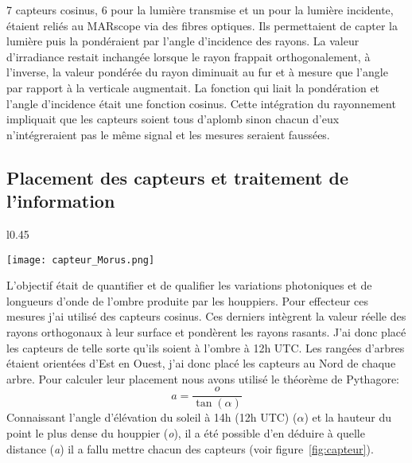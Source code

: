 \documentclass[12pt]{report}
\begin{document}
7 capteurs cosinus, 6 pour la lumière transmise et un pour la lumière incidente,
étaient reliés au MARscope via des fibres optiques. Ils permettaient de capter la
lumière puis la pondéraient par l'angle d'incidence
des rayons. La valeur d'irradiance restait inchangée
lorsque le rayon frappait orthogonalement, à l'inverse, la valeur pondérée du rayon
diminuait au fur et à mesure que l'angle par rapport à la verticale augmentait. La
fonction qui liait la pondération et l'angle d'incidence était une fonction
cosinus. Cette intégration du rayonnement
impliquait que les capteurs soient tous d'aplomb sinon chacun d'eux
n'intégreraient pas le même signal et les mesures seraient faussées.

\subsection{Placement des capteurs et traitement de l'information}

\begin{wrapfigure}{l}{0.45\textwidth}
  \vspace{-20pt}
  \begin{center}
    \texttt{[image: capteur\_Morus.png]}
  \end{center}
  \caption{Photographie d'un capteur sous un \textit{M. alba}\label{fig:capteur}}
\end{wrapfigure}

L'objectif était de quantifier et de qualifier les variations photoniques et de
longueurs d'onde de l'ombre produite par les houppiers. Pour effecteur ces
mesures j'ai utilisé des capteurs cosinus. Ces derniers
intègrent la valeur réelle des rayons orthogonaux à leur surface et pondèrent
les rayons rasants. J'ai donc placé les capteurs de telle sorte qu'ils soient à
l'ombre à 12h UTC. Les rangées d'arbres étaient orientées d'Est en Ouest, j'ai
donc placé les capteurs au Nord de chaque arbre. Pour calculer leur placement
nous avons utilisé le théorème de Pythagore:
\[
    a = \frac{o}{\tan(\alpha)}
\]
Connaissant l'angle d'élévation du soleil à 14h (12h UTC) ($\alpha$) et la hauteur du
point le plus dense du houppier (\textit{o}), il a été possible d'en déduire à quelle
distance (\textit{a}) il a fallu mettre chacun des capteurs (voir figure~\ref{fig:capteur}).
\end{document}
